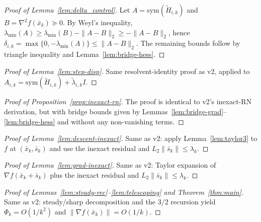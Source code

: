 \documentclass[11pt,a4paper]{article}
\def\cO{O}%
\newcommand{\cO}{\mathcal{O}}
\begin{document}
\begin{proof}[Proof of Lemma~\ref{lem:delta_control}]
	Let $A=\mathrm{sym}(\tilde H_{i,k})$ and $B=\nabla^2 f(\bar x_k)\succeq 0$.
	By Weyl's inequality, $\lambda_{\min}(A)\ge \lambda_{\min}(B)-\|A-B\|_2\ge -\|A-B\|_2$,
	hence $\delta_{i,k}=\max\{0,-\lambda_{\min}(A)\}\le \|A-B\|_2$.
	The remaining bounds follow by triangle inequality and Lemma~\ref{lem:bridge-hess}.
\end{proof}

\begin{proof}[Proof of Lemma~\ref{lem:step-disp}]
	Same resolvent-identity proof as v2, applied to $A_{i,k}=\mathrm{sym}(\tilde H_{i,k})+\tilde\lambda_{i,k}I$.
\end{proof}

\begin{proof}[Proof of Proposition~\ref{prop:inexact-rn}]
	The proof is identical to v2's inexact-RN derivation, but with bridge bounds
	given by Lemmas~\ref{lem:bridge-grad}--\ref{lem:bridge-hess} and without any non-vanishing terms.
\end{proof}

\begin{proof}[Proof of Lemma~\ref{lem:descent-inexact}]
	Same as v2: apply Lemma~\ref{lem:taylor3} to $f$ at $(\bar x_k,\bar s_k)$ and use the inexact residual and $L_2\|\bar s_k\|\le\lambda_k$.
\end{proof}

\begin{proof}[Proof of Lemma~\ref{lem:grad-inexact}]
	Same as v2: Taylor expansion of $\nabla f(\bar x_k+\bar s_k)$ plus the inexact residual and $L_2\|\bar s_k\|\le\lambda_k$.
\end{proof}

\begin{proof}[Proof of Lemmas~\ref{lem:steady-rec}--\ref{lem:telescoping} and Theorem~\ref{thm:main}]
	Same as v2: steady/sharp decomposition and the $3/2$ recursion yield $\Phi_k=\cO(1/k^2)$ and $\|\nabla f(\bar x_k)\|=\cO(1/k)$.
\end{proof}
\end{document}
